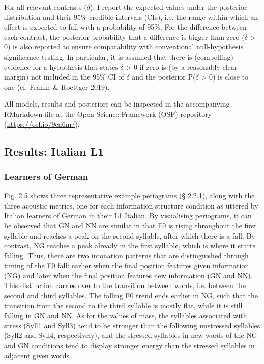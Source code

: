\begin{styleStandard}
For all relevant contrasts ($\delta $), I report the expected values under the posterior distribution and their 95\% credible intervals (CIs), i.e. the range within which an effect is expected to fall with a probability of 95\%. For the difference between each contrast, the posterior probability that a difference is bigger than zero ($\delta $ {\textgreater} 0) is also reported to ensure comparability with conventional null-hypothesis significance testing. In particular, it is assumed that there is (compelling) evidence for a hypothesis that states $\delta $ {\textgreater} 0 if zero is (by a reasonably clear margin) not included in the 95\% CI of $\delta $ and the posterior P($\delta $ {\textgreater} 0) is close to one (cf. Franke \& Roettger 2019). 
\end{styleStandard}

\begin{styleStandard}
All models, results and posteriors can be inspected in the accompanying RMarkdown file at the Open Science Framework (OSF) repository (\url{https://osf.io/9ca6m/}).
\end{styleStandard}

\clearpage\subsection{}
\subsection{Results: Italian L1 }
\hypertarget{Toc191305896}{}\subsubsection{Learners of German}
\hypertarget{Toc191305897}{}\begin{styleStandard}
Fig. 2.5 shows three representative example periograms (§ 2.2.1), along with the three acoustic metrics, one for each information structure condition as uttered by Italian learners of German in their L1 Italian. By visualising periograms, it can be observed that GN and NN are similar in that F0 is rising throughout the first syllable and reaches a peak on the second syllable, after which there is a fall. By contrast, NG reaches a peak already in the first syllable, which is where it starts falling. Thus, there are two intonation patterns that are distinguished through timing of the F0 fall: earlier when the final position features given information (NG) and later when the final position features new information (GN and NN). This distinction carries over to the transition between words, i.e. between the second and third syllables. The falling F0 trend ends earlier in NG, such that the transition from the second to the third syllable is mostly flat, while it is still falling in GN and NN. As for the values of mass, the syllables associated with stress (Syll1 and Syll3) tend to be stronger than the following unstressed syllables (Syll2 and Syll4, respectively), and the stressed syllables in new words of the NG and GN conditions tend to display stronger energy than the stressed syllables in adjacent given words.
\end{styleStandard}

